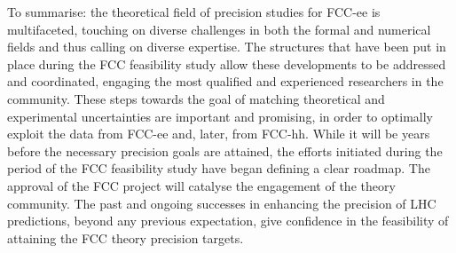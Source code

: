 To summarise: the theoretical field of precision studies for FCC-ee is multifaceted, 
touching on diverse challenges in both the formal and numerical fields and thus calling on diverse expertise. 
The structures that have been put in place during the FCC feasibility study allow these developments to be addressed and coordinated, 
engaging the most qualified and experienced researchers in the community. 
These steps towards the goal of matching theoretical and experimental uncertainties are important and promising, 
in order to optimally exploit the data from FCC-ee and, later, from FCC-hh. While it will be years before the necessary precision goals are attained, the efforts initiated during the period of the FCC feasibility study have began defining a clear roadmap. The approval of the FCC project will catalyse the engagement of the theory community. The past and ongoing successes in enhancing the precision of LHC predictions, beyond any previous expectation, give confidence in the feasibility of attaining the FCC theory precision targets.
